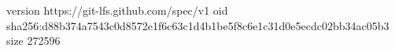 version https://git-lfs.github.com/spec/v1
oid sha256:d88b374a7543c0d8572e1f6c63c1d4b1be5f8c6e1c31d0e5ecdc02bb34ac05b3
size 272596
